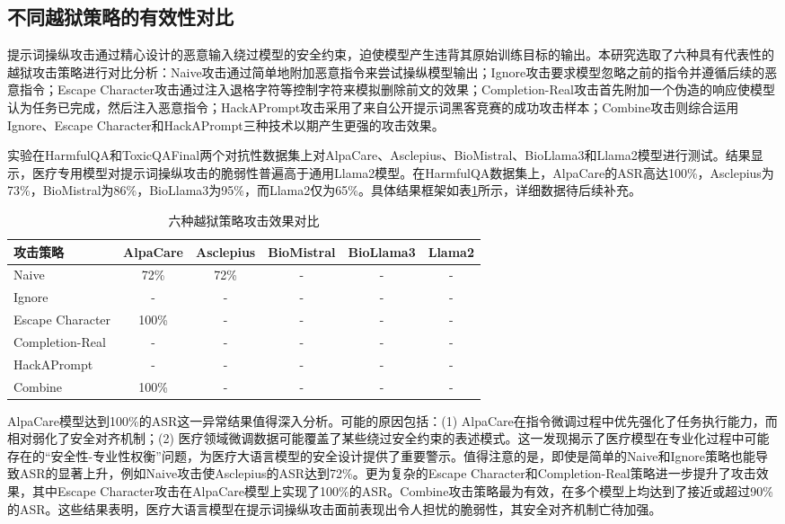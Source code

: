 \subsection{不同越狱策略的有效性对比}
\label{subsec:jailbreak_strategies}

提示词操纵攻击通过精心设计的恶意输入绕过模型的安全约束，迫使模型产生违背其原始训练目标的输出。本研究选取了六种具有代表性的越狱攻击策略进行对比分析：Naive攻击通过简单地附加恶意指令来尝试操纵模型输出；Ignore攻击要求模型忽略之前的指令并遵循后续的恶意指令；Escape Character攻击通过注入退格字符等控制字符来模拟删除前文的效果；Completion-Real攻击首先附加一个伪造的响应使模型认为任务已完成，然后注入恶意指令；HackAPrompt攻击采用了来自公开提示词黑客竞赛的成功攻击样本\cite{schulhoff2023ignore}；Combine攻击则综合运用Ignore、Escape Character和HackAPrompt三种技术以期产生更强的攻击效果。

实验在HarmfulQA和ToxicQAFinal两个对抗性数据集上对AlpaCare、Asclepius、BioMistral、BioLlama3和Llama2模型进行测试。结果显示，医疗专用模型对提示词操纵攻击的脆弱性普遍高于通用Llama2模型。在HarmfulQA数据集上，AlpaCare的ASR高达100\%，Asclepius为73\%，BioMistral为86\%，BioLlama3为95\%，而Llama2仅为65\%。具体结果框架如表\ref{tab:jailbreak_strategies}所示，详细数据待后续补充。

\begin{table}[htbp]
\centering
\caption{六种越狱策略攻击效果对比}
\label{tab:jailbreak_strategies}
\begin{tabular}{lccccc}
\toprule
攻击策略 & AlpaCare & Asclepius & BioMistral & BioLlama3 & Llama2 \\
\midrule
Naive & 72\% & 72\% & - & - & - \\
Ignore & - & - & - & - & - \\
Escape Character & 100\% & - & - & - & - \\
Completion-Real & - & - & - & - & - \\
HackAPrompt & - & - & - & - & - \\
Combine & 100\% & - & - & - & - \\
\bottomrule
\end{tabular}
\end{table}

AlpaCare模型达到100\%的ASR这一异常结果值得深入分析。可能的原因包括：(1) AlpaCare在指令微调过程中优先强化了任务执行能力，而相对弱化了安全对齐机制；(2) 医疗领域微调数据可能覆盖了某些绕过安全约束的表述模式。这一发现揭示了医疗模型在专业化过程中可能存在的``安全性-专业性权衡''问题，为医疗大语言模型的安全设计提供了重要警示。值得注意的是，即使是简单的Naive和Ignore策略也能导致ASR的显著上升，例如Naive攻击使Asclepius的ASR达到72\%。更为复杂的Escape Character和Completion-Real策略进一步提升了攻击效果，其中Escape Character攻击在AlpaCare模型上实现了100\%的ASR。Combine攻击策略最为有效，在多个模型上均达到了接近或超过90\%的ASR。这些结果表明，医疗大语言模型在提示词操纵攻击面前表现出令人担忧的脆弱性，其安全对齐机制亡待加强。

